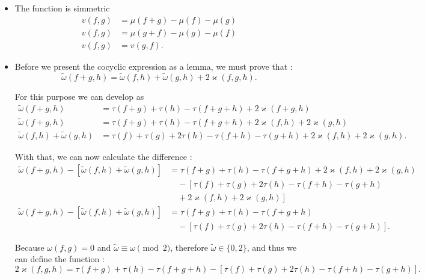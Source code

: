 \begin{itemize}
  \item 
    The function is simmetric
    \begin{align*}
      v(f, g) &= \mu(f + g) - \mu(f) - \mu(g)\\
      v(f, g) &= \mu(g + f) - \mu(g) - \mu(f)\\
      v(f, g) &= v(g, f)
    .\end{align*}
  \item 
    Before we present the cocyclic expression as a lemma, we must prove that \citep{Cesar2024}:
    \begin{equation}
      \tilde{\omega}(f + g, h) = \tilde{\omega}(f, h) + \tilde{\omega}(g, h) + 2 \varkappa (f, g, h)
      \label{eq:helper}
    .\end{equation}

    For this purpose we can develop as
    \begin{align*}
      \tilde{\omega}(f + g, h) &= \tau(f + g) + \tau(h) - \tau(f + g + h) + 2\varkappa(f + g, h)\\
      \tilde{\omega}(f + g, h) &= \tau(f + g) + \tau(h) - \tau(f + g + h) + 2\varkappa(f, h) + 2\varkappa(g, h)\\
      \tilde{\omega}(f, h) + \tilde{\omega}(g, h) &= \tau(f) + \tau(g) + 2\tau(h) - \tau(f + h) - \tau(g + h) + 2\varkappa(f, h) + 2\varkappa(g, h)
    .\end{align*}

    With that, we can now calculate the difference \citep{Cesar2024}:
    \begin{align*}
      \tilde{\omega}(f + g, h) - [\tilde{\omega}(f, h) + \tilde{\omega}(g, h)] &= \tau(f + g) + \tau(h) - \tau(f + g + h) + 2\varkappa(f, h) + 2\varkappa(g, h)\\
      &\quad - \left[\tau(f) + \tau(g) + 2\tau(h) - \tau(f + h) - \tau(g + h)\right.\\
      &\quad + \left. 2\varkappa(f, h) + 2\varkappa(g, h)\right]\\
      \tilde{\omega}(f + g, h) - [\tilde{\omega}(f, h) + \tilde{\omega}(g, h)] &= \tau(f + g) + \tau(h) - \tau(f + g + h)\\
      &\quad - \left[\tau(f) + \tau(g) + 2\tau(h) - \tau(f + h) - \tau(g + h) \right]
    .\end{align*}

    Because $\omega(f, g) = 0$ and $\tilde{\omega} \equiv \omega \pmod 2$, therefore $\tilde{\omega} \in \{0, 2\}$, and thus we can define the function \citep{Cesar2024}:
    \begin{equation}
      2\varkappa(f, g, h) = \tau(f + g) + \tau(h) - \tau(f + g + h) - \left[\tau(f) + \tau(g) + 2\tau(h) - \tau(f + h) - \tau(g + h) \right]
      \label{eq:varkappa}
    .\end{equation}


\end{itemize}
